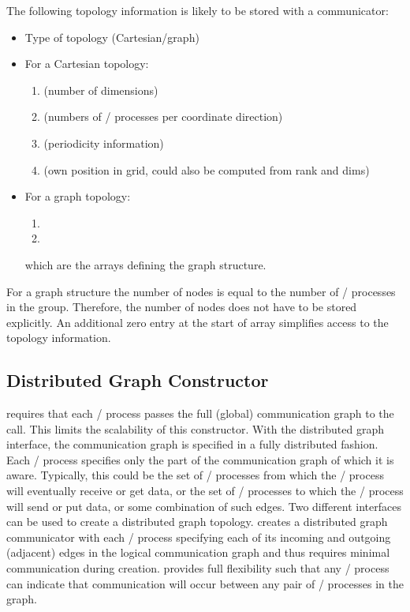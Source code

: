 \begin{implementors}
The following topology information is likely to be stored with a communicator:
\begin{itemize}
\item Type of topology (Cartesian/graph)
\item For a Cartesian topology:
   \begin{enumerate}
   \item {} (number of dimensions)
   \item {} (numbers of \MPI/ processes per coordinate direction)
   \item {} (periodicity information)
   \item {} (own position in grid, could also be computed
                          from rank and dims)
   \end{enumerate}
\item For a graph topology:
   \begin{enumerate}
   \item {}
   \item {}
   \end{enumerate}
which are the arrays defining the graph structure.
\end{itemize}

For a graph structure the number of nodes is equal to the number of \MPI/ processes
in the group. Therefore, the number of nodes does not have to be stored explicitly.  An
additional zero entry at the start of array  simplifies
access to the topology information.
\end{implementors}

\subsection{Distributed Graph Constructor}
\label{subsec:topol-distgraph-constructor} %

 requires that each \MPI/ process passes the
full (global) communication graph to the call. This limits the
scalability of this constructor. With the distributed graph interface,
the communication graph is specified in a fully distributed
fashion. Each \MPI/ process specifies only the part of the communication
graph of which it is aware. Typically, this could be the set of
\MPI/ processes from which the \MPI/ process will eventually receive or get data,
or the set of \MPI/ processes to which the \MPI/ process will send or put data, or
some combination of such edges.  Two different interfaces can be used
to create a distributed graph
topology.  creates a
distributed graph communicator with each \MPI/ process specifying each of its
incoming and outgoing (adjacent) edges in the logical communication
graph and thus requires minimal communication during
creation. 
provides full flexibility such that any \MPI/ process can indicate that
communication will occur between any pair of \MPI/ processes in the graph.

